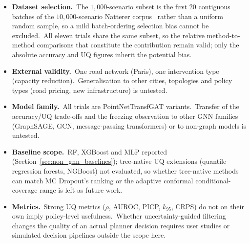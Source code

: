 \begin{itemize}
\item \textbf{Dataset selection.}\ The $1{,}000$-scenario subset is the first 20 contiguous batches of the $10{,}000$-scenario Natterer corpus~\cite{natterer2025ml} rather than a uniform random sample, so a mild batch-ordering selection bias cannot be excluded.\ All eleven trials share the same subset, so the relative method-to-method comparisons that constitute the contribution remain valid; only the absolute accuracy and UQ figures inherit the potential bias.
\item \textbf{External validity.}\ One road network (Paris), one intervention type (capacity reduction).\ Generalisation to other cities, topologies and policy types (road pricing, new infrastructure) is untested.
\item \textbf{Model family.}\ All trials are PointNetTransfGAT variants.\ Transfer of the accuracy/UQ trade-offs and the freezing observation to other GNN families (GraphSAGE, GCN, message-passing transformers) or to non-graph models is untested.
\item \textbf{Baseline scope.}\ RF, XGBoost and MLP reported (Section~\ref{sec:non_gnn_baselines}); tree-native UQ extensions (quantile regression forests, NGBoost) not evaluated, so whether tree-native methods can match MC Dropout's ranking or the adaptive conformal conditional-coverage range is left as future work.
\item \textbf{Metrics.}\ Strong UQ metrics ($\rho$, AUROC, PICP, $k_{95}$, CRPS) do not on their own imply policy-level usefulness.\ Whether uncertainty-guided filtering changes the quality of an actual planner decision requires user studies or simulated decision pipelines outside the scope here.
\end{itemize}
